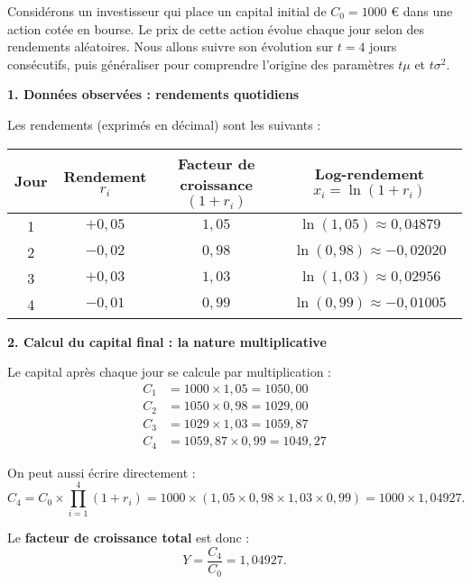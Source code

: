 \begin{examplebox}
Considérons un investisseur qui place un capital initial de \( C_0 = 1000 \) € dans une action cotée en bourse. Le prix de cette action évolue chaque jour selon des rendements aléatoires. Nous allons suivre son évolution sur \( t = 4 \) jours consécutifs, puis généraliser pour comprendre l’origine des paramètres \( t\mu \) et \( t\sigma^2 \).

\medskip
\noindent \textbf{1. Données observées : rendements quotidiens}

Les rendements (exprimés en décimal) sont les suivants :

\vspace{5mm}
\begin{center}
\begin{tabular}{c|c|c|c}
Jour & Rendement \( r_i \) & Facteur de croissance \( (1 + r_i) \) & Log-rendement \( x_i = \ln(1 + r_i) \) \\
\hline
1 & \( +0{,}05 \) & \( 1{,}05 \) & \( \ln(1{,}05) \approx 0{,}04879 \) \\
2 & \( -0{,}02 \) & \( 0{,}98 \) & \( \ln(0{,}98) \approx -0{,}02020 \) \\
3 & \( +0{,}03 \) & \( 1{,}03 \) & \( \ln(1{,}03) \approx 0{,}02956 \) \\
4 & \( -0{,}01 \) & \( 0{,}99 \) & \( \ln(0{,}99) \approx -0{,}01005 \) \\
\end{tabular}
\end{center}
\vspace{5mm}

\medskip
\noindent \textbf{2. Calcul du capital final : la nature multiplicative}

Le capital après chaque jour se calcule par multiplication :
\[
\begin{aligned}
C_1 &= 1000 \times 1{,}05 = 1050{,}00 \\
C_2 &= 1050 \times 0{,}98 = 1029{,}00 \\
C_3 &= 1029 \times 1{,}03 = 1059{,}87 \\
C_4 &= 1059{,}87 \times 0{,}99 = 1049{,}27
\end{aligned}
\]

On peut aussi écrire directement :
\[
C_4 = C_0 \times \prod_{i=1}^{4} (1 + r_i) = 1000 \times (1{,}05 \times 0{,}98 \times 1{,}03 \times 0{,}99) = 1000 \times 1{,}04927.
\]

Le \textbf{facteur de croissance total} est donc :
\[
Y = \frac{C_4}{C_0} = 1{,}04927.
\]


\end{examplebox}
